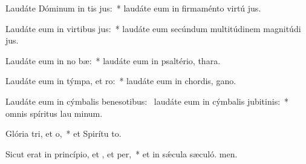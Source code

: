 \item Laudáte Dóminum in tis jus:~* laudáte eum in firmaménto virtú jus.
\item Laudáte eum in virtibus jus:~* laudáte eum secúndum multitúdinem magnitúdi jus.
\item Laudáte eum in no bæ:~* laudáte eum in psaltério,  thara.
\item Laudáte eum in týmpa, et ro:~* laudáte eum in chordis,  gano.
\item Laudáte eum in cýmbalis benesotibus:~\pscross{} laudáte eum in cýmbalis jubitinis:~* omnis spíritus lau minum.
\item Glória tri, et o,~* et Spirítu to.
\item Sicut erat in princípio, et , et per,~* et in sǽcula sæculó. men.
